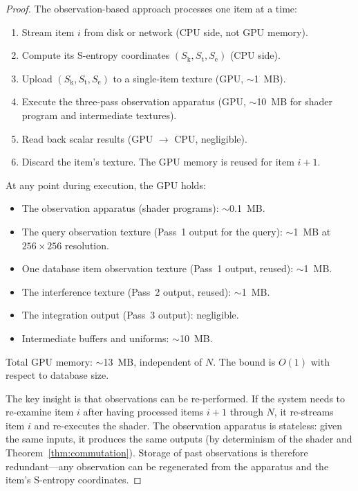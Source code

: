 \documentclass[11pt,twocolumn,a4paper]{article}
\theoremstyle{definition}
\theoremstyle{remark}
\newcommand{\Sk}{S_{\mathrm{k}}}
\newcommand{\St}{S_{\mathrm{t}}}
\newcommand{\Se}{S_{\mathrm{e}}}
\begin{document}
\begin{proof}
The observation-based approach processes one item at a time:
\begin{enumerate}[nosep]
\item Stream item $i$ from disk or network (CPU side, not GPU memory).
\item Compute its S-entropy coordinates $(\Sk, \St, \Se)$ (CPU side).
\item Upload $(\Sk, \St, \Se)$ to a single-item texture (GPU, $\sim$1~MB).
\item Execute the three-pass observation apparatus (GPU, $\sim$10~MB for shader program and intermediate textures).
\item Read back scalar results (GPU $\to$ CPU, negligible).
\item Discard the item's texture. The GPU memory is reused for item $i+1$.
\end{enumerate}

At any point during execution, the GPU holds:
\begin{itemize}[nosep]
\item The observation apparatus (shader programs): $\sim$0.1~MB.
\item The query observation texture (Pass~1 output for the query): $\sim$1~MB at $256 \times 256$ resolution.
\item One database item observation texture (Pass~1 output, reused): $\sim$1~MB.
\item The interference texture (Pass~2 output, reused): $\sim$1~MB.
\item The integration output (Pass~3 output): negligible.
\item Intermediate buffers and uniforms: $\sim$10~MB.
\end{itemize}

Total GPU memory: $\sim$13~MB, independent of $N$. The bound is $O(1)$ with respect to database size.

The key insight is that observations can be re-performed. If the system needs to re-examine item $i$ after having processed items $i+1$ through $N$, it re-streams item $i$ and re-executes the shader. The observation apparatus is stateless: given the same inputs, it produces the same outputs (by determinism of the shader and Theorem~\ref{thm:commutation}). Storage of past observations is therefore redundant---any observation can be regenerated from the apparatus and the item's S-entropy coordinates.
\end{proof}
\end{document}
